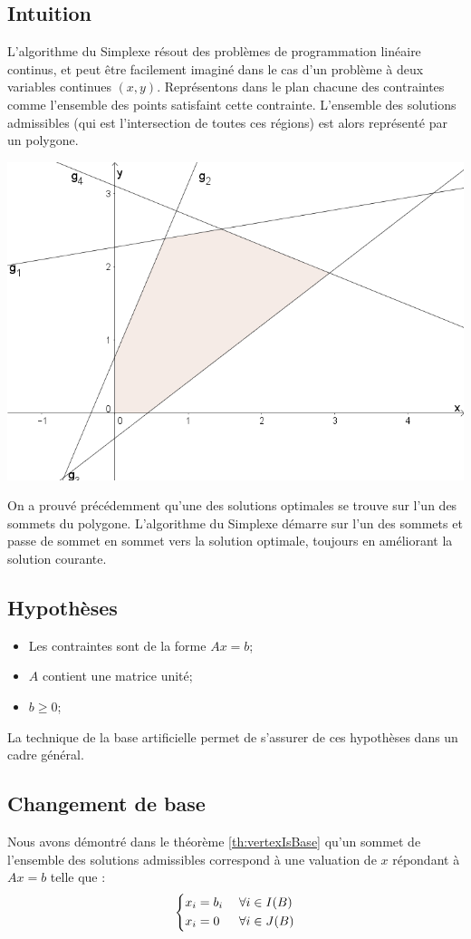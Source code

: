 \documentclass[a4paper]{report}
\theoremstyle{definition}
\theoremstyle{remark}
\theoremstyle{plain}
\begin{document}
\subsection{Intuition}
L'algorithme du Simplexe résout des problèmes de programmation linéaire continus,
et peut être facilement imaginé dans le cas d'un problème à deux variables
continues \((x,y)\). Représentons dans le plan chacune des contraintes comme
l'ensemble des points satisfaint cette contrainte. L'ensemble des solutions
admissibles (qui est l'intersection de toutes ces régions) est alors représenté
par un polygone.
\begin{center}\textbf{\textbf{}}
\includegraphics[width=\textwidth]{simplex-xy.png}
\end{center}
On a prouvé précédemment qu'une des solutions optimales se trouve sur l'un des
sommets du polygone. L'algorithme du Simplexe démarre sur l'un des sommets et
passe de sommet en sommet vers la solution optimale, toujours en améliorant la
solution courante.

\subsection{Hypothèses}
\begin{itemize}
	\item Les contraintes sont de la forme \(Ax=b\);
	\item \(A\) contient une matrice unité;
	\item \(b\ge 0\);
\end{itemize}
La technique de la base artificielle permet de s'assurer de ces hypothèses
dans un cadre général.

\subsection{Changement de base}
Nous avons démontré dans le théorème \ref{th:vertexIsBase} qu'un sommet de
l'ensemble des solutions admissibles correspond à une valuation de $x$ répondant
à $Ax = b$ telle que :
\[\begin{dcases}
	x_i = b_i\;&\forall i \in I(B) \\
	x_i = 0&\forall i \in J(B)
\end{dcases}\]
\end{document}
